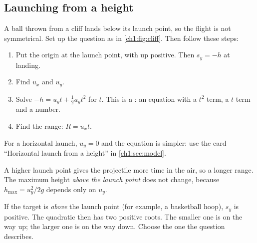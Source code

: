 \subsection{Launching from a height}
A ball thrown from a cliff lands below its launch point, so the flight is not symmetrical.
Set up the question as in \cref{ch1:fig:cliff}. Then follow these steps:
\begin{enumerate}
  \item Put the origin at the launch point, with up positive. Then $s_y = -h$ at landing.
  \item Find $u_x$ and $u_y$.
  \item Solve $-h = u_y t + \frac{1}{2}a_y t^2$ for $t$. This is a :
        an equation with a $t^2$ term, a $t$ term and a number.
  \item Find the range: $R = u_x t$.
\end{enumerate}
For a horizontal launch, $u_y = 0$ and the equation is simpler: use the card ``Horizontal
launch from a height'' in \cref{ch1:sec:model}.

A higher launch point gives the projectile more time in the air, so a longer range. The
maximum height \emph{above the launch point} does not change, because
$h_\mathrm{max} = u_y^2/2g$ depends only on $u_y$.

If the target is \emph{above} the launch point (for example, a basketball hoop), $s_y$ is
positive. The quadratic then has two positive roots. The smaller one is on the way up; the
larger one is on the way down. Choose the one the question describes.

